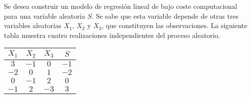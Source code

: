 \ifspanish

\question Se desea construir un modelo de regresión lineal de bajo coste computacional para una variable aleatoria $S$. Se sabe que esta variable depende de otras tres variables aleatorias $X_1$, $X_2$ y $X_3$, que constituyen las observaciones. La siguiente tabla muestra cuatro realizaciones independientes del proceso aleatorio.\\
 \vspace{0.1cm}
 
 \begin{center}
 \begin{tabular}{|c|c|c|c|} \hline
$X_1$&	$X_2$	&$X_3$	&$S$ \\ \hline
$3$	&$-1$ &	$0$ &	$-1$\\ \hline
$-2$ & $0$ &	$1$ &	$-2$\\ \hline
$0$ &	$-1$ &	$2$ &	$0$\\ \hline
$-1$ &	$2$	& $-3$ &	$3$\\ \hline
\end{tabular}
 \end{center}
  \vspace{0.1cm}
 
